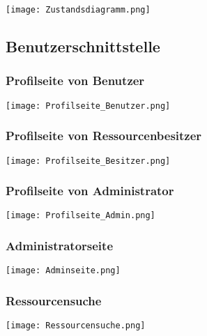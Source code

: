\documentclass[parskip=full,11pt]{scrartcl}
\begin{document}
	\begin{center}
	\texttt{[image: Zustandsdiagramm.png]}
	\end{center}
	
\subsection{Benutzerschnittstelle}

\subsubsection*{Profilseite von Benutzer}
	\begin{center}
	\texttt{[image: Profilseite\_Benutzer.png]}
	\end{center}
	
\subsubsection*{Profilseite von Ressourcenbesitzer}
	\begin{center}
	\texttt{[image: Profilseite\_Besitzer.png]}
	\end{center}
	
\subsubsection*{Profilseite von Administrator}
	\begin{center}
	\texttt{[image: Profilseite\_Admin.png]}
	\end{center}
	
\subsubsection*{Administratorseite}
	\begin{center}
	\texttt{[image: Adminseite.png]}
	\end{center}
	
\subsubsection*{Ressourcensuche}
	\begin{center}
	\texttt{[image: Ressourcensuche.png]}
	\end{center}
	
\end{document}
